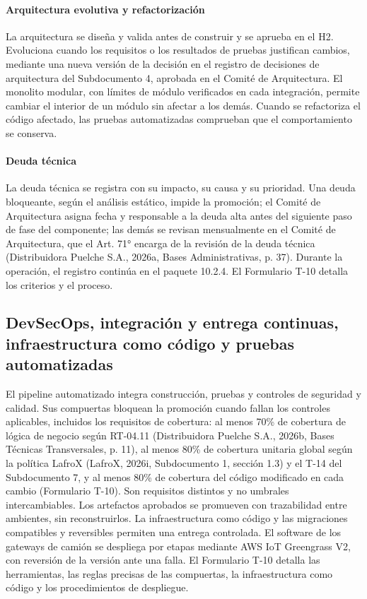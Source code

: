 \paragraph{Arquitectura evolutiva y refactorización} La arquitectura se diseña y valida antes de construir y se aprueba en el H2. Evoluciona cuando los requisitos o los resultados de pruebas justifican cambios, mediante una nueva versión de la decisión en el registro de decisiones de arquitectura del Subdocumento 4, aprobada en el Comité de Arquitectura. El monolito modular, con límites de módulo verificados en cada integración, permite cambiar el interior de un módulo sin afectar a los demás. Cuando se refactoriza el código afectado, las pruebas automatizadas comprueban que el comportamiento se conserva.

\paragraph{Deuda técnica} La deuda técnica se registra con su impacto, su causa y su prioridad. Una deuda bloqueante, según el análisis estático, impide la promoción; el Comité de Arquitectura asigna fecha y responsable a la deuda alta antes del siguiente paso de fase del componente; las demás se revisan mensualmente en el Comité de Arquitectura, que el Art. 71° encarga de la revisión de la deuda técnica (Distribuidora Puelche S.A., 2026a, Bases Administrativas, p. 37). Durante la operación, el registro continúa en el paquete 10.2.4. El Formulario T-10 detalla los criterios y el proceso.

\subsection{DevSecOps, integración y entrega continuas, infraestructura como código y pruebas automatizadas}

El pipeline automatizado integra construcción, pruebas y controles de seguridad y calidad. Sus compuertas bloquean la promoción cuando fallan los controles aplicables, incluidos los requisitos de cobertura: al menos 70\% de cobertura de lógica de negocio según RT-04.11 (Distribuidora Puelche S.A., 2026b, Bases Técnicas Transversales, p. 11), al menos 80\% de cobertura unitaria global según la política LafroX (LafroX, 2026i, Subdocumento 1, sección 1.3) y el T-14 del Subdocumento 7, y al menos 80\% de cobertura del código modificado en cada cambio (Formulario T-10). Son requisitos distintos y no umbrales intercambiables. Los artefactos aprobados se promueven con trazabilidad entre ambientes, sin reconstruirlos. La infraestructura como código y las migraciones compatibles y reversibles permiten una entrega controlada. El software de los gateways de camión se despliega por etapas mediante AWS IoT Greengrass V2, con reversión de la versión ante una falla. El Formulario T-10 detalla las herramientas, las reglas precisas de las compuertas, la infraestructura como código y los procedimientos de despliegue.

